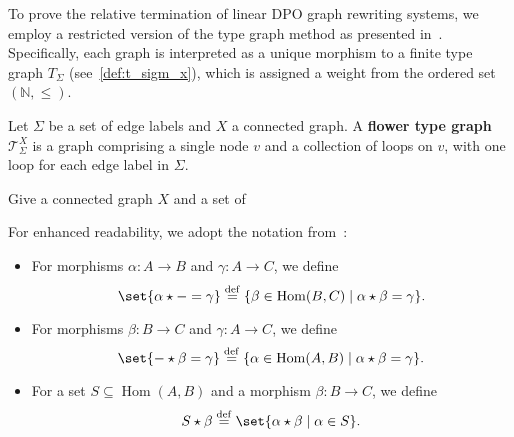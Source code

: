 To prove the relative termination of linear DPO graph rewriting systems, we employ a restricted version of the type graph method as presented in~\cite{endrullis2023generalized}. Specifically, each graph is interpreted as a unique morphism to a finite type graph \( T_\Sigma \) (see~\autoref{def:t_sigm_x}), which is assigned a weight from the ordered set \((\mathbb{N}, \leq)\).

\begin{definition}
    \label{def:t_sigm_x}
    Let $\Sigma$ be a set of edge labels and \( X \) a connected graph.
    A \textbf{flower type graph} \( \mathcal{T}_\Sigma^X \) is a graph comprising a single node \( v \) and a collection of loops on \( v \), with one loop for each edge label in \( \Sigma \).
\end{definition}
Give a connected graph $X$ and a set of 

\begin{remark}[Notation]
    For enhanced readability, we adopt the notation from~\cite[Notation 3.3]{endrullis2023generalized}:
    \begin{itemize}
        \item For morphisms \( \alpha : A \to B \) and \( \gamma : A \to C \), we define
        \[
            \set{ \alpha \star - = \gamma } \overset{\operatorname{def}}{=} \{ \beta \in \operatorname{Hom}(B, C) \mid \alpha \star \beta = \gamma \}.
        \]
        \item For morphisms \( \beta : B \to C \) and \( \gamma : A \to C \), we define
        \[
            \set{ - \star \beta = \gamma } \overset{\operatorname{def}}{=} \{ \alpha \in \operatorname{Hom}(A, B) \mid \alpha \star \beta = \gamma \}.
        \]
        \item For a set \( S \subseteq \operatorname{Hom}(A, B) \) and a morphism \( \beta : B \to C \), we define
        \[
            S \star \beta \overset{\operatorname{def}}{=} \set{ \alpha \star \beta \mid \alpha \in S }.
        \]
    \end{itemize}
\end{remark}

